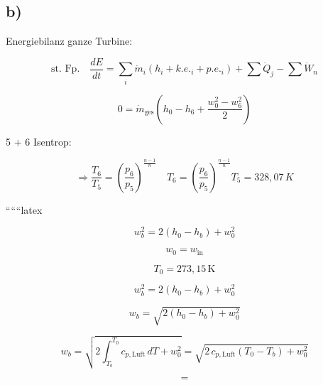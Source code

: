 

\subsection*{b)}

Energiebilanz ganze Turbine:

\[
\text{st. Fp.} \quad \frac{dE}{dt} = \sum_i \dot{m}_i (h_i + k.e._i + p.e._i) + \sum \dot{Q}_j - \sum \dot{W}_n
\]

\[
0 = \dot{m}_{\text{ges}} (h_0 - h_6 + \frac{w_0^2 - w_6^2}{2})
\]

5 + 6 Isentrop:

\[
\Rightarrow \frac{T_6}{T_5} = \left( \frac{p_6}{p_5} \right)^{\frac{n-1}{n}} \quad T_6 = \left( \frac{p_6}{p_5} \right)^{\frac{n-1}{n}} T_5 = 328,07 \, K
\]

``````latex


\[
w_{b}^2 = 2 \left( h_0 - h_b \right) + w_0^2
\]

\[
w_0 = w_{\text{in}} 
\]

\[
T_0 = 273{,}15 \, \text{K}
\]

\[
w_{b}^2 = 2 \left( h_0 - h_b \right) + w_0^2
\]

\[
w_{b} = \sqrt{2 \left( h_0 - h_b \right) + w_0^2}
\]

\[
w_{b} = \sqrt{2 \int_{T_b}^{T_0} c_{p,\text{Luft}} \, dT + w_0^2} = \sqrt{2 \, c_{p,\text{Luft}} \left( T_0 - T_b \right) + w_0^2}
\]

\[
=
\]
